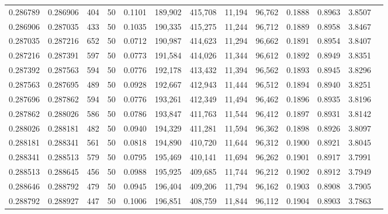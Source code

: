 \begin{tabular}{rrrrrrrrrrrrr}
0.286789 & 0.286906 &   404 &  50 &                                     0.1101 & 189,902 & 415,708 &  11,194 &  96,762 & 0.1888 & 0.8963 & 3.8507 \\
0.286906 & 0.287035 &   433 &  50 &                                     0.1035 & 190,335 & 415,275 &  11,244 &  96,712 & 0.1889 & 0.8958 & 3.8467 \\
0.287035 & 0.287216 &   652 &  50 &                                     0.0712 & 190,987 & 414,623 &  11,294 &  96,662 & 0.1891 & 0.8954 & 3.8407 \\
0.287216 & 0.287391 &   597 &  50 &                                     0.0773 & 191,584 & 414,026 &  11,344 &  96,612 & 0.1892 & 0.8949 & 3.8351 \\
0.287392 & 0.287563 &   594 &  50 &                                     0.0776 & 192,178 & 413,432 &  11,394 &  96,562 & 0.1893 & 0.8945 & 3.8296 \\
0.287563 & 0.287695 &   489 &  50 &                                     0.0928 & 192,667 & 412,943 &  11,444 &  96,512 & 0.1894 & 0.8940 & 3.8251 \\
0.287696 & 0.287862 &   594 &  50 &                                     0.0776 & 193,261 & 412,349 &  11,494 &  96,462 & 0.1896 & 0.8935 & 3.8196 \\
0.287862 & 0.288026 &   586 &  50 &                                     0.0786 & 193,847 & 411,763 &  11,544 &  96,412 & 0.1897 & 0.8931 & 3.8142 \\
0.288026 & 0.288181 &   482 &  50 &                                     0.0940 & 194,329 & 411,281 &  11,594 &  96,362 & 0.1898 & 0.8926 & 3.8097 \\
0.288181 & 0.288341 &   561 &  50 &                                     0.0818 & 194,890 & 410,720 &  11,644 &  96,312 & 0.1900 & 0.8921 & 3.8045 \\
0.288341 & 0.288513 &   579 &  50 &                                     0.0795 & 195,469 & 410,141 &  11,694 &  96,262 & 0.1901 & 0.8917 & 3.7991 \\
0.288513 & 0.288645 &   456 &  50 &                                     0.0988 & 195,925 & 409,685 &  11,744 &  96,212 & 0.1902 & 0.8912 & 3.7949 \\
0.288646 & 0.288792 &   479 &  50 &                                     0.0945 & 196,404 & 409,206 &  11,794 &  96,162 & 0.1903 & 0.8908 & 3.7905 \\
0.288792 & 0.288927 &   447 &  50 &                                     0.1006 & 196,851 & 408,759 &  11,844 &  96,112 & 0.1904 & 0.8903 & 3.7863 \\

\end{tabular}
